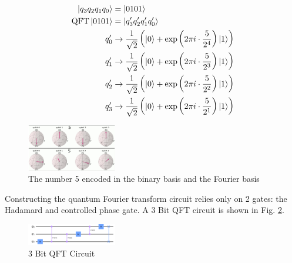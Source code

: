 \documentclass[journal]{IEEEtran}
\begin{document}
\begin{align*}
    \ket{q_{3} q_{2} q_{1} q_{0}} & =\ket{0101}                                                                                              \\
    \operatorname{QFT}\ket{0101}  & =\ket{q_{3} 'q_{2} 'q_{1} 'q_{0} '}                                                                      \\
    q_{0} '                       & \rightarrow \frac{1}{\sqrt{2}}\left(\ket{0} +\exp\left( 2\pi i\cdot \frac{5}{2^{4}}\right)\ket{1}\right) \\
    q_{1} '                       & \rightarrow \frac{1}{\sqrt{2}}\left(\ket{0} +\exp\left( 2\pi i\cdot \frac{5}{2^{3}}\right)\ket{1}\right) \\
    q_{2} '                       & \rightarrow \frac{1}{\sqrt{2}}\left(\ket{0} +\exp\left( 2\pi i\cdot \frac{5}{2^{2}}\right)\ket{1}\right) \\
    q_{3} '                       & \rightarrow \frac{1}{\sqrt{2}}\left(\ket{0} +\exp\left( 2\pi i\cdot \frac{5}{2^{1}}\right)\ket{1}\right)
\end{align*}

\begin{figure}[H]
    \begin{center}
        \includegraphics[width=0.35\textwidth]{FourierBasis.png}
        \caption{\label{fig:FourierBasis} The number 5 encoded in the binary basis and the Fourier basis }
    \end{center}
\end{figure}


Constructing the quantum Fourier transform circuit relies only on 2 gates: the Hadamard and
controlled phase gate. A 3 Bit QFT circuit is shown in Fig. \ref{fig:QFTCirc}.

\begin{figure}[H]
    \begin{center}
        \includegraphics[width=0.35\textwidth]{QFTCirc.png}
        \caption{\label{fig:QFTCirc} 3 Bit QFT Circuit}
    \end{center}
\end{figure}
\end{document}
